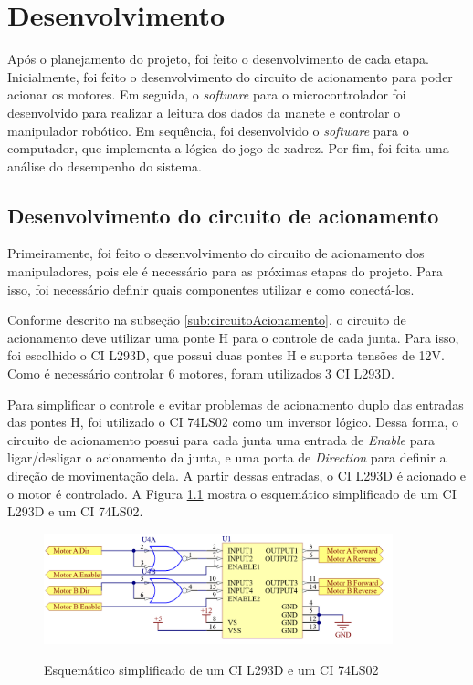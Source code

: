 \chapter[Desenvolvimento]{Desenvolvimento}
\label{cap:desenvolvimento}

Após o planejamento do projeto, foi feito o desenvolvimento de cada etapa.
Inicialmente, foi feito o desenvolvimento do circuito de acionamento para poder acionar os motores.
Em seguida, o \textit{software} para o microcontrolador foi desenvolvido para realizar a leitura dos dados da manete e controlar o manipulador robótico.
Em sequência, foi desenvolvido o \textit{software} para o computador, que implementa a lógica do jogo de xadrez.
Por fim, foi feita uma análise do desempenho do sistema.

\section[Desenvolvimento do circuito de acionamento]{Desenvolvimento do circuito de acionamento}
\label{sec:desenvolvimentoCircuitoAcionamento}

Primeiramente, foi feito o desenvolvimento do circuito de acionamento dos manipuladores, pois ele é necessário para as próximas etapas do projeto.
Para isso, foi necessário definir quais componentes utilizar e como conectá-los.

Conforme descrito na subseção \ref{sub:circuitoAcionamento}, o circuito de acionamento deve utilizar uma ponte H para o controle de cada junta.
Para isso, foi escolhido o CI L293D, que possui duas pontes H e suporta tensões de 12V.
Como é necessário controlar 6 motores, foram utilizados 3 CI L293D.

Para simplificar o controle e evitar problemas de acionamento duplo das entradas das pontes H, foi utilizado o CI 74LS02 como um inversor lógico.
Dessa forma, o circuito de acionamento possui para cada junta uma entrada de \textit{Enable} para ligar/desligar o acionamento da junta, e uma porta de \textit{Direction} para definir a direção de movimentação dela.
A partir dessas entradas, o CI L293D é acionado e o motor é controlado.
A Figura \ref{fig:esquematicoSimplificado} mostra o esquemático simplificado de um CI L293D e um CI 74LS02.

\begin{figure}[H]
    \centering
    \caption{Esquemático simplificado de um CI L293D e um CI 74LS02}
    \includegraphics[keepaspectratio=true, width=0.9\textwidth]
    	{img/placa-controle-esquematico-simplificado.png}
    \label{fig:esquematicoSimplificado}
\end{figure}

